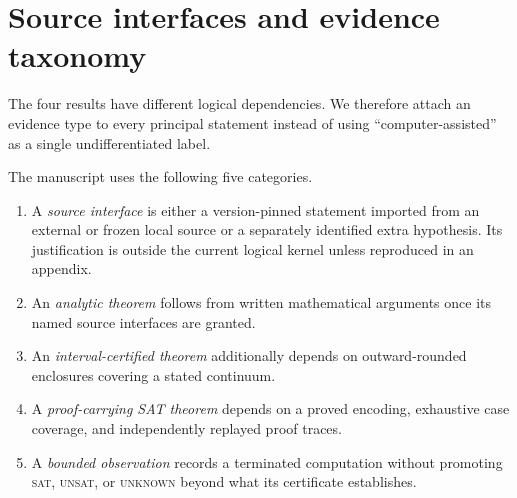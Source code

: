 \section{Source interfaces and evidence taxonomy}\label{sec:evidence-taxonomy}

The four results have different logical dependencies.  We therefore attach
an evidence type to every principal statement instead of using
``computer-assisted'' as a single undifferentiated label.

\begin{definition}
The manuscript uses the following five categories.
\begin{enumerate}[label=(\roman*)]
\item A \emph{source interface} is either a version-pinned statement imported
  from an external or frozen local source or a separately identified extra
  hypothesis.  Its justification is outside the current logical kernel unless
  reproduced in an appendix.
\item An \emph{analytic theorem} follows from written mathematical arguments
  once its named source interfaces are granted.
\item An \emph{interval-certified theorem} additionally depends on
  outward-rounded enclosures covering a stated continuum.
\item A \emph{proof-carrying SAT theorem} depends on a proved encoding,
  exhaustive case coverage, and independently replayed proof traces.
\item A \emph{bounded observation} records a terminated computation without
  promoting \textsc{sat}, \textsc{unsat}, or \textsc{unknown} beyond what its
  certificate establishes.
\end{enumerate}
\end{definition}

